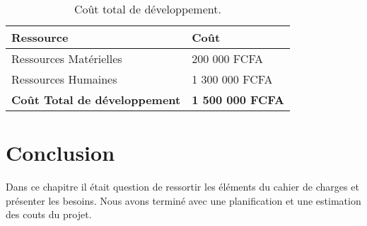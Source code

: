 \begin{table}[H]
    \centering
    \caption{Coût total de développement.}
    \begin{tabular}[t]{|p{7cm}|p{8cm}|} 
        \hline
        \textbf{Ressource} & \textbf{Coût} \\
        \hline\hline
        Ressources Matérielles & 200 000 FCFA \\
        \hline
        Ressources Humaines & 1 300 000 FCFA \\
        \hline
        \textbf{Coût Total de développement} & \textbf{1 500 000 FCFA} \\
        \hline\hline
    \end{tabular}
    \label{tab:couttotal}
\end{table}%



\section*{Conclusion}%
% 
Dans ce chapitre il était question de ressortir les éléments du cahier de charges et présenter les besoins. Nous avons terminé avec une planification et une estimation des couts du projet.